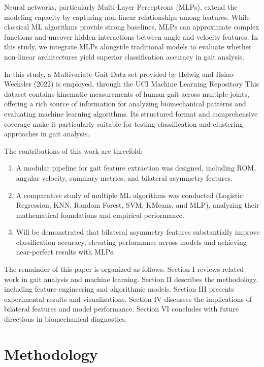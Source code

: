\documentclass[journal]{IEEEtran}
\begin{document}
Neural networks, particularly Multi-Layer Perceptrons (MLPs), extend the modeling capacity by capturing non-linear relationships among features.
While classical ML algorithms provide strong baselines, MLPs can approximate complex functions and uncover hidden interactions between angle and velocity features. 
In this study, we integrate MLPs alongside traditional models to evaluate whether non-linear architectures yield superior classification accuracy in gait analysis.

In this study, a Multivariate Gait Data set provided by Helwig and Hsiao-Wecksler (2022) is employed, through the UCI Machine Learning Repository \cite{helwig2022gait}
This dataset contains kinematic measurements of human gait across multiple joints, offering a rich source of information for analyzing biomechanical patterns and 
evaluating machine learning algorithms. Its structured format and comprehensive coverage make it particularly suitable for testing classification and clustering 
approaches in gait analysis.

The contributions of this work are threefold:
\begin{enumerate}
    \item A modular pipeline for gait feature extraction was designed, including ROM, angular velocity, summary metrics, and bilateral asymmetry features.
    \item A comparative study of multiple ML algorithms was conducted (Logistic Regression, KNN, Random Forest, SVM, KMeans, and MLP), analyzing their mathematical foundations and empirical performance.
    \item Will be demonstrated that bilateral asymmetry features substantially improve classification accuracy, elevating performance across models and achieving near-perfect results with MLPs.
\end{enumerate}

The remainder of this paper is organized as follows. Section I reviews related work in gait analysis and machine learning. Section II describes the methodology, 
including feature engineering and algorithmic models. Section III presents experimental results and visualizations. Section IV discusses the implications of bilateral 
features and model performance. Section VI concludes with future directions in biomechanical diagnostics.

\section{Methodology}
\end{document}
